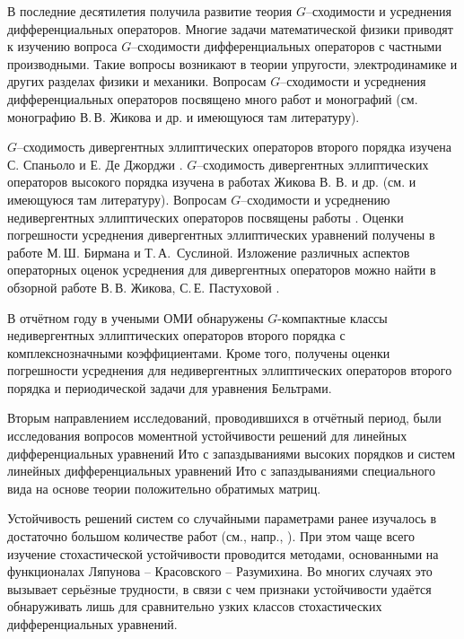 \Introduction




В последние десятилетия получила развитие теория $G$--сходимос\-ти и усреднения дифференциальных
операторов. Многие задачи математической
физики приводят к изучению вопроса $G$--сходимос\-ти дифференциальных
операторов с частными производными. Такие вопросы возникают в теории упругости,
электродинамике и других разделах физики и механики. Вопросам
$G$--сходимости и усреднения дифференциальных
операторов посвящено много работ и монографий (см. монографию В.\,В. Жикова и др.
\cite{smm_ZhKO} и имеющуюся там литературу).

$G$--сходимость дивергентных эллиптических операторов второго порядка изучена
С. Спаньоло и Е. Де Джорджи \cite{smm_Dg1, smm_Dg2, smm_Dg3}.
$G$--сходимость дивергентных эллиптических операторов высокого порядка изучена в
работах Жикова В. В. и др. (см. \cite{smm_ZhKO} и имеющуюся там литературу).
Вопросам $G$--сходимости и усреднению недивергентных эллиптических операторов
посвящены работы \cite{smm_ZhS, smm_ZhS1, smm_Sir1,smm_Sir}.
Оценки погрешности усреднения  дивергентных эллиптических уравнений  получены в работе  \cite{smm_Sus} М.\,Ш. Бирмана и
  Т.\,А.~Суслиной.
Изложение различных аспектов операторных оценок усреднения для дивергентных
операторов можно найти в обзорной работе В.\,В. Жикова,
С.\,Е. Пастуховой  \cite{smm_VP}.

В отчётном году в учеными ОМИ обнаружены $G$-компактные классы недивергентных эллиптических операторов второго порядка с комплекснозначными коэффициентами.
Кроме того, получены оценки погрешности усреднения для недивергентных
эллиптических операторов второго порядка и периодической задачи для уравнения Бельтрами.



Вторым направлением исследований, проводившихся в отчётный период, были исследования вопросов моментной устойчивости решений для линейных дифференциальных уравнений Ито с запаздываниями высоких порядков и систем линейных дифференциальных уравнений Ито с запаздываниями специального вида на основе теории положительно обратимых матриц.

Устойчивость решений систем со случайными параметрами ранее изучалось в достаточно большом количестве работ (см., напр., \cite{kri-bib-1, kri-bib-2, kri-bib-3, kri-bib-4}). При этом чаще всего изучение стохастической устойчивости проводится методами, основанными на функционалах Ляпунова -- Красовского -- Разумихина.
Во многих случаях это вызывает серьёзные трудности, в связи с чем признаки устойчивости удаётся обнаруживать лишь для сравнительно узких классов стохастических дифференциальных уравнений.

